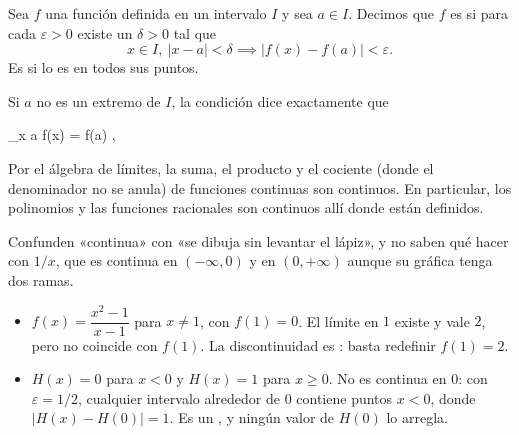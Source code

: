 
\begin{frame}

\begin{definition}[Continuidad]
Sea $f$ una función definida en un intervalo $I$ y sea $a \in I$. Decimos que
$f$ es  si para cada $\varepsilon > 0$ existe un
$\delta > 0$ tal que
\[
  x \in I, \ |x - a| < \delta \implies |f(x) - f(a)| < \varepsilon .
\]
Es  si lo es en todos sus puntos.
\end{definition}

Si $a$ no es un extremo de $I$, la condición dice exactamente que
\begin{keyformula}
  \lim_{x \to a} f(x) = f(a) ,
\end{keyformula}
\end{frame}

\begin{frame}

\begin{remark}
Por el álgebra de límites, la suma, el producto y el cociente (donde el
denominador no se anula) de funciones continuas son continuos. En particular,
los polinomios y las funciones racionales son continuos allí donde están
definidos.
\end{remark}

\begin{commonmistake}
Confunden «continua» con «se dibuja sin levantar el lápiz», y no saben qué
hacer con $1/x$, que es continua en $(-\infty, 0)$ y en $(0, +\infty)$ aunque
su gráfica tenga dos ramas.
\end{commonmistake}
\end{frame}

\begin{frame}

\begin{example}
\begin{itemize}
  \item $f(x) = \dfrac{x^2 - 1}{x - 1}$ para $x \neq 1$, con $f(1) = 0$. El
        límite en $1$ existe y vale $2$, pero no coincide con $f(1)$. La
        discontinuidad es : basta redefinir $f(1) = 2$.
  \item $H(x) = 0$ para $x < 0$ y $H(x) = 1$ para $x \geq 0$. No es continua
        en $0$: con $\varepsilon = 1/2$, cualquier intervalo alrededor de $0$
        contiene puntos $x < 0$, donde $|H(x) - H(0)| = 1$. Es un
        , y ningún valor de $H(0)$ lo arregla.
\end{itemize}
\end{example}
\end{frame}
